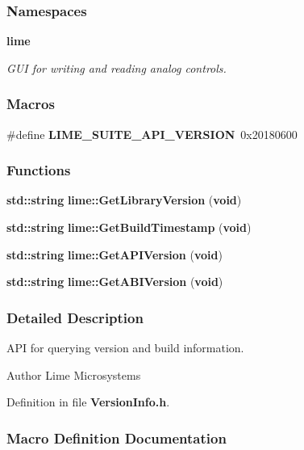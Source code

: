 \subsubsection*{Namespaces}
\begin{DoxyCompactItemize}
\item 
 {\bf lime}
\begin{DoxyCompactList}\small\item\em G\+UI for writing and reading analog controls. \end{DoxyCompactList}\end{DoxyCompactItemize}
\subsubsection*{Macros}
\begin{DoxyCompactItemize}
\item 
\#define {\bf L\+I\+M\+E\+\_\+\+S\+U\+I\+T\+E\+\_\+\+A\+P\+I\+\_\+\+V\+E\+R\+S\+I\+ON}~0x20180600
\end{DoxyCompactItemize}
\subsubsection*{Functions}
\begin{DoxyCompactItemize}
\item 
{\bf std\+::string} {\bf lime\+::\+Get\+Library\+Version} ({\bf void})
\item 
{\bf std\+::string} {\bf lime\+::\+Get\+Build\+Timestamp} ({\bf void})
\item 
{\bf std\+::string} {\bf lime\+::\+Get\+A\+P\+I\+Version} ({\bf void})
\item 
{\bf std\+::string} {\bf lime\+::\+Get\+A\+B\+I\+Version} ({\bf void})
\end{DoxyCompactItemize}


\subsubsection{Detailed Description}
A\+PI for querying version and build information. 

\begin{DoxyAuthor}{Author}
Lime Microsystems 
\end{DoxyAuthor}


Definition in file {\bf Version\+Info.\+h}.



\subsubsection{Macro Definition Documentation}
